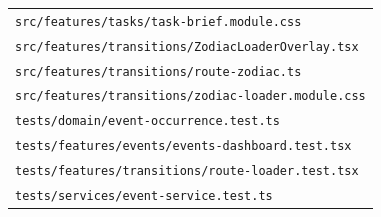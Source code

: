 \begin{longtable}{p{}}
\texttt{src/\allowbreak{}features/\allowbreak{}tasks/\allowbreak{}task-brief.module.css} \\
\texttt{src/\allowbreak{}features/\allowbreak{}transitions/\allowbreak{}ZodiacLoaderOverlay.tsx} \\
\texttt{src/\allowbreak{}features/\allowbreak{}transitions/\allowbreak{}route-zodiac.ts} \\
\texttt{src/\allowbreak{}features/\allowbreak{}transitions/\allowbreak{}zodiac-loader.module.css} \\
\texttt{tests/\allowbreak{}domain/\allowbreak{}event-occurrence.test.ts} \\
\texttt{tests/\allowbreak{}features/\allowbreak{}events/\allowbreak{}events-dashboard.test.tsx} \\
\texttt{tests/\allowbreak{}features/\allowbreak{}transitions/\allowbreak{}route-loader.test.tsx} \\
\texttt{tests/\allowbreak{}services/\allowbreak{}event-service.test.ts} \\
\bottomrule
\end{longtable}
